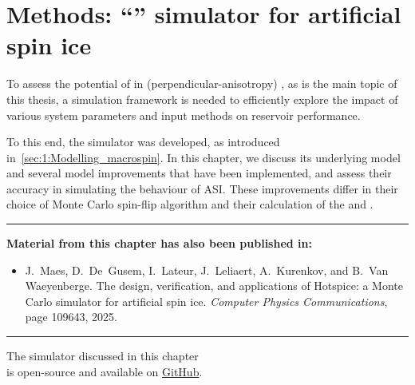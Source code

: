 \chapter{Methods: ``\hotspice'' simulator for artificial spin ice}\label{ch:Hotspice}

To assess the potential of  in (perpendicular-anisotropy) , as is the main topic of this thesis, a simulation framework is needed to efficiently explore the impact of various system parameters and input methods on reservoir performance. \par
To this end, the \hotspice simulator was developed, as introduced in~\cref{sec:1:Modelling_macrospin}.
In this chapter, we discuss its underlying model and several model improvements that have been implemented, and assess their accuracy in simulating the behaviour of ASI.
These improvements differ in their choice of Monte Carlo spin-flip algorithm and their calculation of the  and .

\begin{adjustwidth}{2em}{2em}
	\vspace{0em}
	\begin{center}
		\centering\rule{0.7\linewidth}{0.4pt}
	\end{center}
	\vspace{0em}
	\begin{center}
		\textbf{Material from this chapter has also been published in:} \\
	\end{center}
	\vspace{0em}
	\begin{adjustwidth}{0em}{1.5em}
		\begin{itemize}
			\item[\cite{MAES-24}] J.~Maes, D.~De~Gusem, I.~Lateur, J.~Leliaert, A.~Kurenkov, and B.~Van Waeyenberge.
			\newblock The design, verification, and applications of Hotspice: a Monte Carlo simulator for artificial spin ice.
			\newblock \emph{Computer Physics Communications}, page 109643, 2025.
		\end{itemize}
	\end{adjustwidth}
	\vspace{-0.5em}
	\begin{center}
		\centering\rule{0.7\linewidth}{0.4pt}
	\end{center}
	\vspace{-1em}
	\begin{center}
		The \hotspice simulator discussed in this chapter\\
		is open-source and available on \href{https://github.com/bvwaeyen/Hotspice}{GitHub}.
	\end{center}
\end{adjustwidth}

